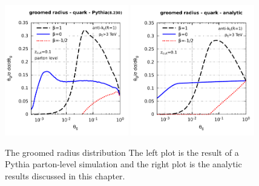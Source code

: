 \begin{figure}[t!]
  \centering
  \includegraphics[width=0.48\textwidth,page=1]{figures/zgthetag-pythia.pdf}%
  \hfill%
  \includegraphics[width=0.48\textwidth,page=1]{figures/zgthetag-analytic.pdf}%
  \caption{The groomed radius distribution The left plot is the result of a Pythia parton-level
    simulation and the right plot is the analytic results discussed in
    this chapter.}\label{fig:radius-pythia-v-analytic}
\end{figure}



